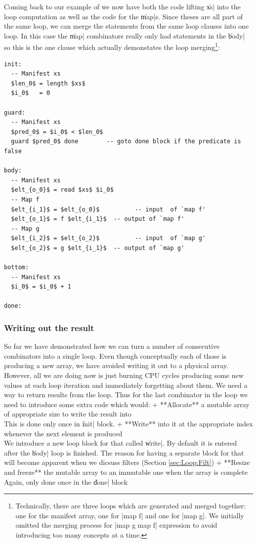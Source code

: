 \documentclass[preamble.tex]{subfiles}
\begin{document}
Coming back to our example of  we now have both the code lifting \|xs| into the loop computation as well as the code for the \|map|s. Since theses are all part of the same loop, we can merge the statements from the same loop clauses into one loop. In this case the \|map| combinators really only had statements in the \|body| so this is the one clause which actually demonstates the loop merging\footnote{Technically, there are three loops which are generated and merged together: one for the manifest array, one for |map f| and one for |map g|. We initially omitted the merging process for |map g \compose map f| expression to avoid introducing too many concepts at a time.}:

\begin{lstlisting}[mathescape]
init:
  -- Manifest xs
  $len_0$ = length $xs$
  $i_0$   = 0

guard:
  -- Manifest xs
  $pred_0$ = $i_0$ < $len_0$
  guard $pred_0$ done        -- goto done block if the predicate is false

body:
  -- Manifest xs
  $elt_{o_0}$ = read $xs$ $i_0$
  -- Map f
  $elt_{i_1}$ = $elt_{o_0}$          -- input  of `map f'
  $elt_{o_1}$ = f $elt_{i_1}$  -- output of `map f'
  -- Map g
  $elt_{i_2}$ = $elt_{o_2}$          -- input  of `map g'
  $elt_{o_2}$ = g $elt_{i_1}$  -- output of `map g'

bottom:
  -- Manifest xs
  $i_0$ = $i_0$ + 1

done:

\end{lstlisting}




\subsubsection{Writing out the result}

So far we have demonstrated how we can turn a number of consecutive combinators into a single loop. Even though conceptually each of those is producing a new array, we have avoided writing it out to a physical array. However, all we are doing now is just burning CPU cycles producing some new values at each loop iteration and immediately forgetting about them. We need a way to return results from the loop. Thus for the last combinator in the loop we need to introduce some extra code which would:
+ **Allocate** a mutable array of appropriate size to write the result into\\
  This is done only once in \|init| block.
+ **Write** into it at the appropriate index whenever the next element is produced\\
  We introduce a new loop block for that called \|write|. By default it is entered after the \|body| loop is finished. The reason for having a separate block for that will become apparent when we dicsuss filters (Section \ref{sec:Loop:Filt})
+ **Resize and freeze** the mutable array to an immutable one when the array is complete\\
  Again, only done once in the \|done| block
\end{document}
